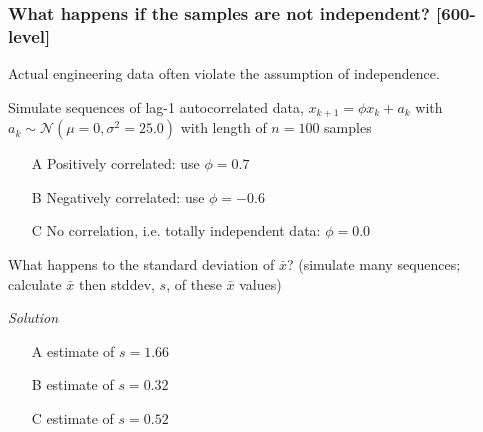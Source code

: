 \begin{frame}\frametitle{{\color{myOrange}{Side discussion:}} What happens if the samples are not independent? [600-level]}
	Actual engineering data often violate the assumption of independence.

	Simulate sequences of lag-1 autocorrelated data, $x_{k+1} = \phi x_{k} + a_k$ with $a_k \sim \mathcal{N}\left(\mu=0, \sigma^2 = 25.0 \right)$ with length of $n=100$ samples
	\begin{itemize}
		\item[A]	Positively correlated: use $\phi = 0.7$
		\item[B]	Negatively correlated: use $\phi = -0.6$
		\item[C]	No correlation, i.e. totally independent data: $\phi = 0.0$
	\end{itemize}

	What happens to the standard deviation of $\bar{x}$? (simulate many sequences; calculate $\bar{x}$ then stddev, $s$, of these $\bar{x}$ values)

	\myhrule
	\emph{Solution}
	\begin{itemize}
		\item[A]	estimate of $s = 1.66$
		\item[B]	estimate of $s = 0.32$
		\item[C]	estimate of $s = 0.52$ {}
	\end{itemize}
\end{frame} 

